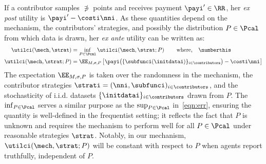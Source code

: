  \hspace{-0.1in}
If a contributor samples $\nni$ points and receives payment $\payi' \in \RR$, her \emph{ex post} utility is $\payi' - \costi \nni$.
As these quantities depend on the mechanism, the contributors' strategies, and possibly the distribution $P \in \Pcal$ from which data is drawn, her \emph{ex ante} utility can be written as:
\begin{align*}
    \utilci(\mech, \strat)
        &= \inf_{P\in\Pcal} \utilci(\mech, \strat; P)
        \hspace{0.3in}\text{where, }\hspace{0.1in}
          \numberthis  \label{eqn:utilc}
        \\
    \utilci(\mech, \strat; P)
        &= \EE_{M, \sigma, P}\left[ \payi\big(\{\subfunci(\initdatai)\}_{i\in\contributors}\big)
                - \costi \nni\right]
\end{align*}
The expectation $\EE_{M, \sigma, P}$ is taken over the randomness in the mechanism, the contributor strategies $\strati = (\nni, \subfunci)_{i \in \contributors}$, and the stochasticity of i.i.d. datasets $\{\initdatai\}_{i \in \contributors}$ drawn from $P$. The $\inf_{P \in \Pcal}$ serves a similar purpose as the $\sup_{P \in \Pcal}$ in~\eqref{eqn:err}, ensuring the quantity is well-defined in the frequentist setting; it reflects the fact that $P$ is unknown and requires the mechanism to perform well for all $P \in \Pcal$ under reasonable strategies $\strat$. Notably, in our mechanism, $\utilci(\mech,\strat; P)$ will be constant with respect to $P$ when agents report truthfully, \ie independent of $P$.


